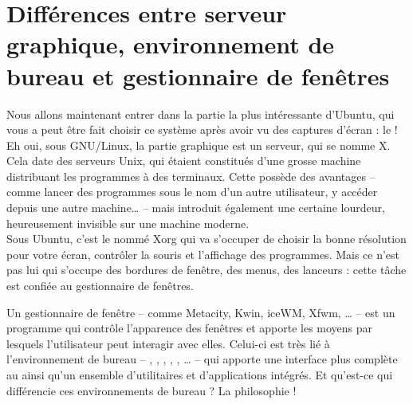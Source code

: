 \section{Différences entre serveur graphique, environnement de bureau et gestionnaire de fenêtres}
\label{RefConnexionX}
Nous allons maintenant entrer dans la partie la plus intéressante d'Ubuntu, qui vous a peut être fait choisir ce système après avoir vu des captures d'écran : le  ! Eh oui, sous GNU/Linux, la partie graphique est un serveur, qui se nomme X. Cela date des serveurs Unix, qui étaient constitués d'une grosse machine distribuant les programmes à des terminaux. Cette  possède des avantages -- comme lancer des programmes sous le nom d'un autre utilisateur, y accéder depuis une autre machine\ldots{} -- mais introduit également une certaine lourdeur, heureusement invisible sur une machine moderne.\\
Sous Ubuntu, c'est le  nommé Xorg qui va s'occuper de choisir la bonne résolution pour votre écran, contrôler la souris et l'affichage des programmes. Mais ce n'est pas lui qui s'occupe des bordures de fenêtre, des menus, des lanceurs : cette tâche est confiée au gestionnaire de fenêtres.\par
Un gestionnaire de fenêtre -- comme Metacity, Kwin, iceWM, Xfwm, \ldots{} -- est un programme qui contrôle l'apparence des fenêtres et apporte les moyens par lesquels l'utilisateur peut interagir avec elles. Celui-ci est très lié à l'environnement de bureau -- , , , , , \ldots{} -- qui apporte une interface plus complète au  ainsi qu'un ensemble d'utilitaires et d'applications intégrés. Et qu'est-ce qui différencie ces environnements de bureau ? La philosophie !\par
{}
